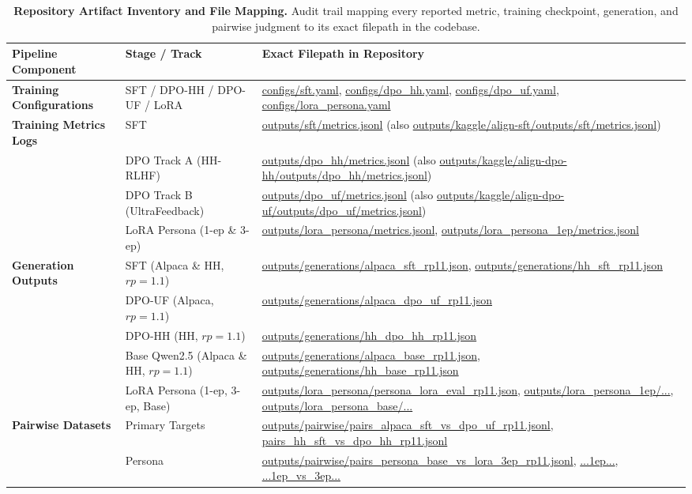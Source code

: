 \documentclass[11pt,a4paper]{article}
\begin{document}
\begin{table}[t]
\centering
\scriptsize
\setlength{\tabcolsep}{2.5pt}
\renewcommand{\arraystretch}{0.86}
\caption{\textbf{Repository Artifact Inventory and File Mapping.} Audit trail mapping every reported metric, training checkpoint, generation, and pairwise judgment to its exact filepath in the codebase.}
\label{tab:artifacts}
\begin{tabularx}{\textwidth}{llX}
\toprule
\textbf{Pipeline Component} & \textbf{Stage / Track} & \textbf{Exact Filepath in Repository} \\
\midrule
\textbf{Training Configurations} & SFT / DPO-HH / DPO-UF / LoRA & \url{configs/sft.yaml}, \url{configs/dpo_hh.yaml}, \url{configs/dpo_uf.yaml}, \url{configs/lora_persona.yaml} \\
\textbf{Training Metrics Logs} & SFT & \url{outputs/sft/metrics.jsonl} (also \url{outputs/kaggle/align-sft/outputs/sft/metrics.jsonl}) \\
& DPO Track A (HH-RLHF) & \url{outputs/dpo_hh/metrics.jsonl} (also \url{outputs/kaggle/align-dpo-hh/outputs/dpo_hh/metrics.jsonl}) \\
& DPO Track B (UltraFeedback) & \url{outputs/dpo_uf/metrics.jsonl} (also \url{outputs/kaggle/align-dpo-uf/outputs/dpo_uf/metrics.jsonl}) \\
& LoRA Persona (1-ep \& 3-ep) & \url{outputs/lora_persona/metrics.jsonl}, \url{outputs/lora_persona_1ep/metrics.jsonl} \\
\textbf{Generation Outputs} & SFT (Alpaca \& HH, $rp=1.1$) & \url{outputs/generations/alpaca_sft_rp11.json}, \url{outputs/generations/hh_sft_rp11.json} \\
& DPO-UF (Alpaca, $rp=1.1$) & \url{outputs/generations/alpaca_dpo_uf_rp11.json} \\
& DPO-HH (HH, $rp=1.1$) & \url{outputs/generations/hh_dpo_hh_rp11.json} \\
& Base Qwen2.5 (Alpaca \& HH, $rp=1.1$) & \url{outputs/generations/alpaca_base_rp11.json}, \url{outputs/generations/hh_base_rp11.json} \\
& LoRA Persona (1-ep, 3-ep, Base) & \url{outputs/lora_persona/persona_lora_eval_rp11.json}, \url{outputs/lora_persona_1ep/...}, \url{outputs/lora_persona_base/...} \\
\textbf{Pairwise Datasets} & Primary Targets & \url{outputs/pairwise/pairs_alpaca_sft_vs_dpo_uf_rp11.jsonl}, \url{pairs_hh_sft_vs_dpo_hh_rp11.jsonl} \\
& Persona & \url{outputs/pairwise/pairs_persona_base_vs_lora_3ep_rp11.jsonl}, \url{...1ep...}, \url{...1ep_vs_3ep...} \\

\end{tabularx}
\end{table}
\end{document}
